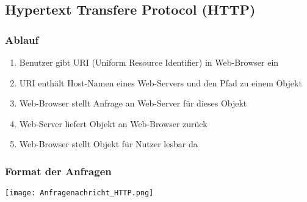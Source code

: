 	\subsection{Hypertext Transfere Protocol (HTTP)}
		\subsubsection{Ablauf}
			\begin{enumerate}
				\item Benutzer gibt URI (Uniform Resource Identifier) in Web-Browser ein
				\item URI enthält Host-Namen eines Web-Servers und den Pfad zu einem Objekt
				\item Web-Browser stellt Anfrage an Web-Server für dieses Objekt
				\item Web-Server liefert Objekt an Web-Browser zurück
				\item Web-Browser stellt Objekt für Nutzer lesbar da
			\end{enumerate}
		\subsubsection{Format der Anfragen}
			\texttt{[image: Anfragenachricht\_HTTP.png]}
